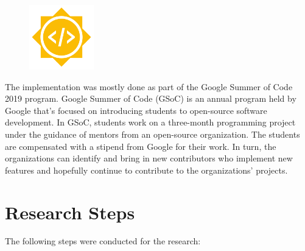 \begin{figure}
	\centering
    \includegraphics[width=0.25\textwidth]{pics/GSoC.png}
	\label{fig:gsoc}
\end{figure}

The  implementation was mostly done as part of the Google
Summer of Code 2019 program. Google Summer of Code (GSoC) is an annual program
held by Google that's focused on introducing students to open-source software
development. In GSoC, students work on a three-month programming project under
the guidance of mentors from an open-source organization. The students are
compensated with a stipend from Google for their work. In turn, the
organizations can identify and bring in new contributors who implement new
features and hopefully continue to contribute to the organizations' projects.

\section{Research Steps}

The following steps were conducted for the research:

